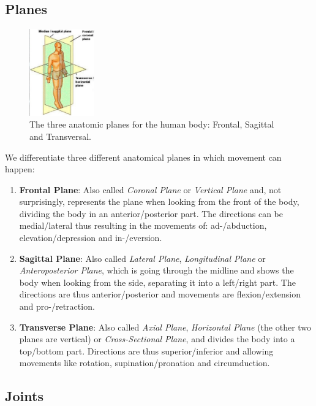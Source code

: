 \subsection{Planes}\label{subsec:planes}

\begin{figure}
    \centering
    \includegraphics[width=0.25\textwidth]{images/anatomy_planes}
    \caption{The three anatomic planes for the human body: Frontal, Sagittal and Transversal.}
\end{figure}

We differentiate three different anatomical planes in which movement can happen:

\begin{enumerate}
    \setlength\itemsep{0em}
    \item \textbf{Frontal Plane}: Also called \textit{Coronal Plane} or \textit{Vertical Plane} and, not surprisingly, represents the plane when looking from the front of the body, dividing the body in an anterior/posterior part.
    The directions can be medial/lateral thus resulting in the movements of: ad-/abduction, elevation/depression and in-/eversion.
    \item \textbf{Sagittal Plane}: Also called \textit{Lateral Plane}, \textit{Longitudinal Plane} or \textit{Anteroposterior Plane}, which is going through the midline and shows the body when looking from the side, separating it into a left/right part.
    The directions are thus anterior/posterior and movements are flexion/extension and pro-/retraction.
    \item \textbf{Transverse Plane}: Also called \textit{Axial Plane}, \textit{Horizontal Plane} (the other two planes are vertical) or \textit{Cross-Sectional Plane}, and divides the body into a top/bottom part.
    Directions are thus superior/inferior and allowing movements like rotation, supination/pronation and circumduction.
\end{enumerate}


\subsection{Joints}\label{subsec:joints}

